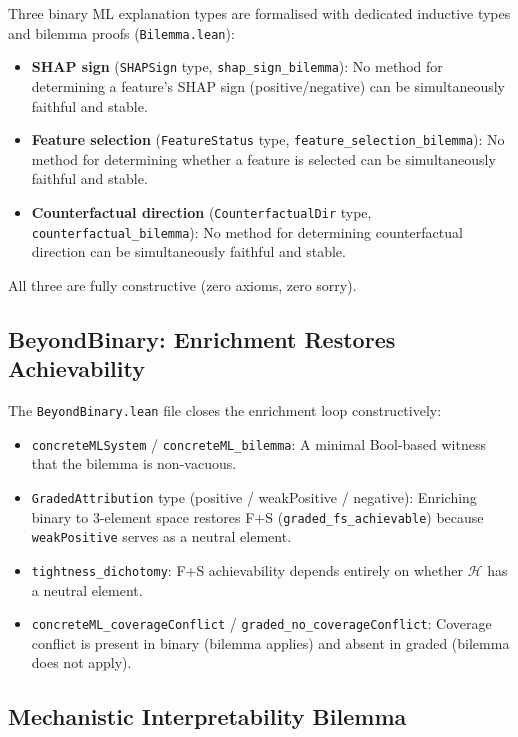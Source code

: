 \documentclass[11pt,a4paper]{article}
\begin{document}
Three binary ML explanation types are formalised with dedicated inductive types and bilemma proofs (\texttt{Bilemma.lean}):

\begin{itemize}
  \item \textbf{SHAP sign} (\texttt{SHAPSign} type, \texttt{shap\_sign\_bilemma}): No method for determining a feature's SHAP sign (positive/negative) can be simultaneously faithful and stable.
  \item \textbf{Feature selection} (\texttt{FeatureStatus} type, \texttt{feature\_selection\_bilemma}): No method for determining whether a feature is selected can be simultaneously faithful and stable.
  \item \textbf{Counterfactual direction} (\texttt{CounterfactualDir} type, \texttt{counterfactual\_bilemma}): No method for determining counterfactual direction can be simultaneously faithful and stable.
\end{itemize}

All three are fully constructive (zero axioms, zero sorry).

\subsection{BeyondBinary: Enrichment Restores Achievability}

The \texttt{BeyondBinary.lean} file closes the enrichment loop constructively:

\begin{itemize}
  \item \texttt{concreteMLSystem} / \texttt{concreteML\_bilemma}: A minimal Bool-based witness that the bilemma is non-vacuous.
  \item \texttt{GradedAttribution} type (positive / weakPositive / negative): Enriching binary to 3-element space restores F+S (\texttt{graded\_fs\_achievable}) because \texttt{weakPositive} serves as a neutral element.
  \item \texttt{tightness\_dichotomy}: F+S achievability depends entirely on whether $\mathcal{H}$ has a neutral element.
  \item \texttt{concreteML\_coverageConflict} / \texttt{graded\_no\_coverageConflict}: Coverage conflict is present in binary (bilemma applies) and absent in graded (bilemma does not apply).
\end{itemize}

\subsection{Mechanistic Interpretability Bilemma}
\end{document}
